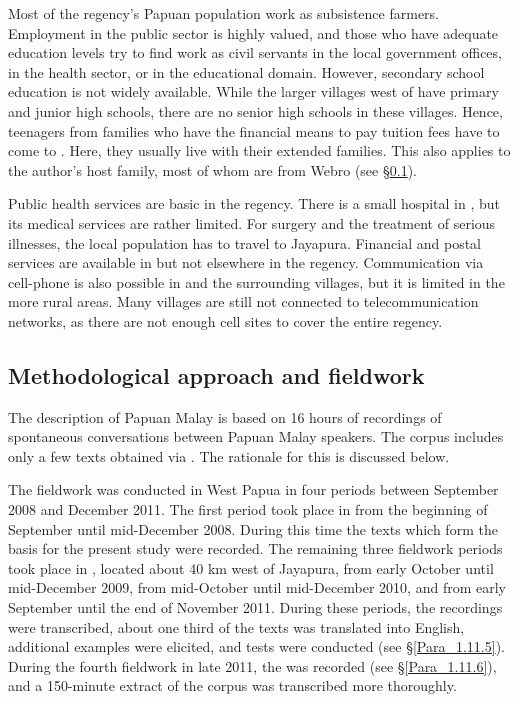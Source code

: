 {Most of the  regency’s Papuan population work as subsistence farmers. Employment in the public sector is highly valued, and those who have adequate education levels try to find work as civil servants in the local government offices, in the health sector, or in the educational domain. However, secondary school education is not widely available. While the larger villages west of  have primary and junior high schools, there are no senior high schools in these villages. Hence, teenagers from families who have the financial means to pay tuition fees have to come to . Here, they usually live with their extended families. This also applies to the author’s host family, most of whom are from Webro (see §\ref{Para_1.11.3}).


\largerpage
Public health services are basic in the regency. There is a small hospital in , but its medical services are rather limited. For surgery and the treatment of serious illnesses, the local population has to travel to Jayapura. Financial and postal services are available in  but not elsewhere in the regency. Communication via cell-phone is also possible in  and the surrounding villages, but it is limited in the more rural areas. Many villages are still not connected to telecommunication networks, as there are not enough cell sites to cover the entire regency.

\subsection{Methodological approach and fieldwork}\label{Para_1.11.3}
The description of Papuan Malay is based on 16 hours of recordings of spontaneous conversations between Papuan Malay speakers. The corpus includes only a few texts obtained via . The rationale for this  is discussed below.



The fieldwork was conducted in West Papua in four periods between September 2008 and December 2011. The first period took place in  from the beginning of September until mid-December 2008. During this time the texts which form the basis for the present study were recorded. The remaining three fieldwork periods took place in , located about 40 km west of Jayapura, from early October until mid-December 2009, from mid-October until mid-December 2010, and from early September until the end of November 2011. During these periods, the recordings were transcribed, about one third of the texts was translated into English, additional examples were elicited, and  tests were conducted (see §\ref{Para_1.11.5}). During the fourth fieldwork in late 2011, the  was recorded (see §\ref{Para_1.11.6}), and a 150-minute extract of the corpus was transcribed more thoroughly.



}
